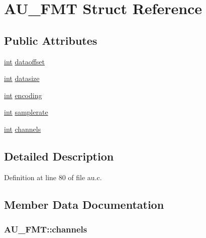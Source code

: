 \hypertarget{struct_a_u___f_m_t}{}\section{A\+U\+\_\+\+F\+MT Struct Reference}
\label{struct_a_u___f_m_t}
\subsection*{Public Attributes}
\begin{DoxyCompactItemize}
\item 
\hyperlink{xmltok_8h_a5a0d4a5641ce434f1d23533f2b2e6653}{int} \hyperlink{struct_a_u___f_m_t_a83149000ae22c56c9aa42c68066586a9}{dataoffset}
\item 
\hyperlink{xmltok_8h_a5a0d4a5641ce434f1d23533f2b2e6653}{int} \hyperlink{struct_a_u___f_m_t_a97f85bfafdae48717307bbf8db1ee168}{datasize}
\item 
\hyperlink{xmltok_8h_a5a0d4a5641ce434f1d23533f2b2e6653}{int} \hyperlink{struct_a_u___f_m_t_adeebf6b8f89f5904213a54d082a38cbf}{encoding}
\item 
\hyperlink{xmltok_8h_a5a0d4a5641ce434f1d23533f2b2e6653}{int} \hyperlink{struct_a_u___f_m_t_a478b9bcd00bcdac55506c8b868da0d8b}{samplerate}
\item 
\hyperlink{xmltok_8h_a5a0d4a5641ce434f1d23533f2b2e6653}{int} \hyperlink{struct_a_u___f_m_t_a1dfde690a308e2d826684fbf61acfa7e}{channels}
\end{DoxyCompactItemize}


\subsection{Detailed Description}


Definition at line 80 of file au.\+c.



\subsection{Member Data Documentation}
\subsubsection[{\texorpdfstring{channels}{channels}}]{ A\+U\+\_\+\+F\+M\+T\+::channels}\hypertarget{struct_a_u___f_m_t_a1dfde690a308e2d826684fbf61acfa7e}{}\label{struct_a_u___f_m_t_a1dfde690a308e2d826684fbf61acfa7e}


